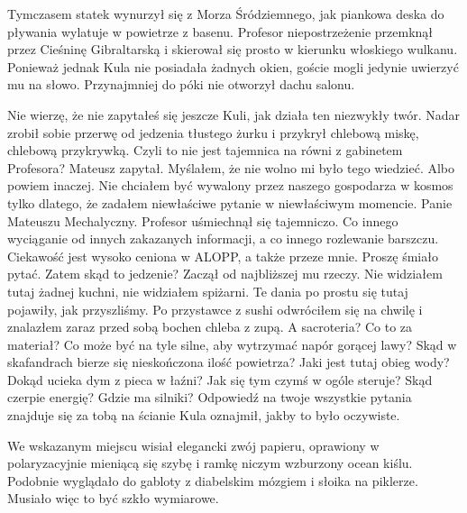 Tymczasem statek wynurzył się z Morza Śródziemnego, jak piankowa deska do pływania wylatuje w powietrze z basenu. 
Profesor niepostrzeżenie przemknął przez Cieśninę Gibraltarską i skierował się prosto w kierunku włoskiego wulkanu.
Ponieważ jednak Kula nie posiadała żadnych okien, goście mogli jedynie uwierzyć mu na słowo. Przynajmniej do póki nie otworzył dachu salonu.

\begin{dialogue}
\ds{} Nie wierzę, że nie zapytałeś się jeszcze Kuli, jak działa ten niezwykły twór. \dm{} Nadar zrobił sobie przerwę od jedzenia 
tłustego żurku i przykrył chlebową miskę, chlebową przykrywką.
\ds{} Czyli to nie jest tajemnica na równi z gabinetem Profesora? \dm{} Mateusz zapytał. \dm{} Myślałem, że nie wolno mi było tego wiedzieć.
Albo powiem inaczej. Nie chciałem być wywalony przez naszego gospodarza w kosmos tylko dlatego, że zadałem niewłaściwe pytanie w niewłaściwym momencie.
\ds{} Panie Mateuszu Mechalyczny. \dm{} Profesor uśmiechnął się tajemniczo. \dm{} Co innego wyciąganie od innych zakazanych informacji, a co innego rozlewanie barszczu. 
Ciekawość jest wysoko ceniona w ALOPP, a także przeze mnie. Proszę śmiało pytać.
\ds{} Zatem skąd to jedzenie? \dm{} Zaczął od najbliższej mu rzeczy. \dm{} Nie widziałem tutaj żadnej kuchni, nie widziałem spiżarni.
Te dania po prostu się tutaj pojawiły, jak przyszliśmy. Po przystawce z sushi odwróciłem się na chwilę i znalazłem zaraz przed sobą bochen chleba z zupą.
A sacroteria? Co to za materiał? Co może być na tyle silne, aby wytrzymać napór gorącej lawy? 
Skąd w skafandrach bierze się nieskończona ilość powietrza? Jaki jest tutaj obieg wody? 
Dokąd ucieka dym z pieca w łaźni? Jak się tym czymś w ogóle steruje? Skąd czerpie energię? Gdzie ma silniki?
\ds{} Odpowiedź na twoje wszystkie pytania znajduje się za tobą na ścianie \dm{} Kula oznajmił, jakby to było oczywiste.
\end{dialogue}

We wskazanym miejscu wisiał elegancki zwój papieru, oprawiony w polaryzacyjnie mieniącą się szybę i ramkę niczym wzburzony ocean kiślu.
Podobnie wyglądało do gabloty z diabelskim mózgiem i słoika na piklerze. Musiało więc to być szkło wymiarowe.

\divider{} \divider{} \divider{} 


